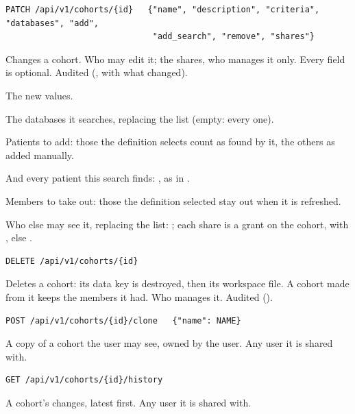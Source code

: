 \begin{lstlisting}[style=signature]
PATCH /api/v1/cohorts/{id}   {"name", "description", "criteria", "databases", "add",
                              "add_search", "remove", "shares"}
\end{lstlisting}
Changes a cohort. Who may edit it; the shares, who manages it only. Every field is optional. Audited
(, with what changed).
\begin{params}
\item[name, description, criteria] The new values.
\item[databases] The databases it searches, replacing the list (empty: every one).
\item[add] Patients to add: those the definition selects count as found by it, the others as
  added manually.
\item[add\_search] And every patient this search finds: , as in
  .
\item[remove] Members to take out: those the definition selected stay out when it is refreshed.
\item[shares] Who else may see it, replacing the list:
  ; each share is a grant on the cohort,
   with , else .
\end{params}

\begin{lstlisting}[style=signature]
DELETE /api/v1/cohorts/{id}
\end{lstlisting}
Deletes a cohort: its data key is destroyed, then its workspace file. A cohort made from it
keeps the members it had. Who manages it. Audited ().

\begin{lstlisting}[style=signature]
POST /api/v1/cohorts/{id}/clone   {"name": NAME}
\end{lstlisting}
A copy of a cohort the user may see, owned by the user. Any user it is shared with.

\begin{lstlisting}[style=signature]
GET /api/v1/cohorts/{id}/history
\end{lstlisting}
A cohort's changes, latest first. Any user it is shared with.

